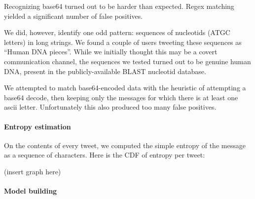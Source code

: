 \documentclass[a4paper,11pt]{article}
\begin{document}
Recognizing base64 turned out to be harder than expected. Regex matching yielded a significant number of false positives.

We did, however, identify one odd pattern: sequences of nucleotids (ATGC letters) in long strings. We found a couple of users tweeting these sequences as ``Human DNA pieces''. While we initially thought this may be a covert communication channel, the sequences we tested turned out to be genuine human DNA, present in the publicly-available BLAST nucleotid database.

We attempted to match base64-encoded data with the heuristic of attempting a base64 decode, then keeping only the messages for which there is at least one ascii letter. Unfortunately this also produced too many false positives.


\paragraph{Entropy estimation}

On the contents of every tweet, we computed the simple entropy of the message as a sequence of characters. Here is the CDF of entropy per tweet:

(insert graph here)

\paragraph{Model building}
\end{document}
